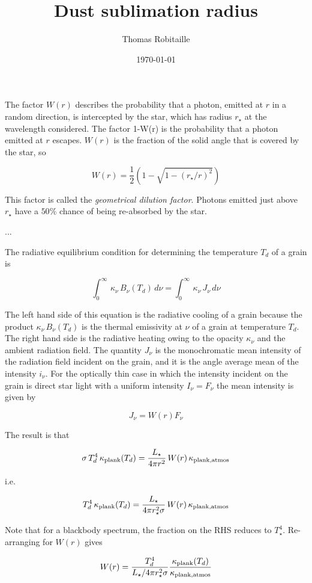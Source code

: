 \documentclass[11pt]{article}
\begin{document}
\title{Dust sublimation radius}
\author{Thomas Robitaille}
\date{\today}
\maketitle

The factor $W(r)$ describes the probability that a photon, emitted at $r$ in a random direction, is intercepted by the star, which has radius $r_\star$ at the wavelength considered. The factor 1-W(r) is the probability that a photon emitted at $r$ escapes. $W(r)$ is the fraction of the solid angle that is covered by the star, so

$$
W(r) = \frac{1}{2}\left(1-\sqrt{1-(r_{\star}/r)^2}\right)
$$

This factor is called the \textit{geometrical dilution factor}. Photons emitted just above $r_\star$ have a $50$\% chance of being re-absorbed by the star.

...

The radiative equilibrium condition for determining the temperature $T_d$ of a grain is

$$
\int_0^\infty\,\kappa_\nu\,B_\nu(T_d)\,d\nu = \int_0^\infty\,\kappa_\nu\,J_\nu\,d\nu
$$

The left hand side of this equation is the radiative cooling of a grain because the product $\kappa_\nu\,B_\nu(T_d)$ is the thermal emissivity at $\nu$ of a grain at temperature $T_d$. The right hand side is the radiative heating owing to the opacity $\kappa_\nu$ and the ambient radiation field. The quantity $J_\nu$ is the monochromatic mean intensity of the radiation field incident on the grain, and it is the angle average mean of the intensity $i_\nu$. For the optically thin case in which the intensity incident on the grain is direct star light with a uniform intensity $I_\nu=F_\nu$ the mean intensity is given by

$$
J_\nu = W(r) F_\nu
$$

The result is that

$$
\sigma\,T_d^4\,\kappa_{\rm plank}(T_d) = \frac{L_\star}{4\pi r^2}\,W(r)\,\kappa_{\rm plank, atmos}
$$

i.e.

$$
T_d^4\,\kappa_{\rm plank}(T_d) = \frac{L_\star}{4\pi r_\star^2\sigma}\,W(r)\,\kappa_{\rm plank, atmos}
$$

Note that for a blackbody spectrum, the fraction on the RHS reduces to $T_\star^4$. Re-arranging for $W(r)$ gives

$$
W(r) = \frac{T_d^4}{L_\star/4\pi r_\star^2\sigma}\frac{\kappa_{\rm plank}(T_d)}{\kappa_{\rm plank, atmos}}
$$
\end{document}
